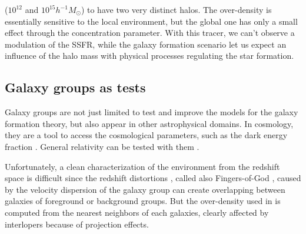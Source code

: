 ($10^{12}$ and $10^{15} h^{-1} M_\odot$) to have two very distinct halos. The
over-density is essentially sensitive to the local environment, but the global
one has only a small effect through the concentration parameter. With this
tracer, we can't observe a modulation of the SSFR\@, while the galaxy formation
scenario let us expect an influence of the halo mass with physical processes
regulating the star formation.
%

\subsection{Galaxy groups as tests}
\label{sub:galaxy_groups_as_tests}

Galaxy groups are not just limited to test and improve the models for the
galaxy formation theory, but also appear in other astrophysical domains. In
cosmology, they are a tool to access the cosmological parameters, such as
the dark energy fraction \citep{Wang+98}. General relativity can be tested
with them \citep{Wojtak+11}.

Unfortunately, a clean characterization of the environment from the redshift
space is difficult since the redshift distortions \citep{Jackson+72}, called
also Fingers-of-God \citep{Tully+78}, caused by the velocity dispersion of the
galaxy group can create overlapping between galaxies of foreground or
background groups. But the over-density used in \citet{Peng+10} is computed
from the nearest neighbors of each galaxies, clearly affected by interlopers
because of projection effects.

